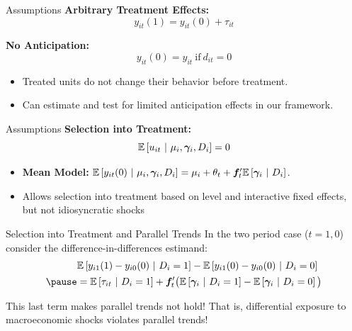 \documentclass[aspectratio=43,t]{beamer}
\begin{document}
\begin{frame}{Assumptions}
    \textbf{Arbitrary Treatment Effects:}
    \begin{equation}
        y_{it}(1) = y_{it}(0) + \tau_{it}
    \end{equation}


    \bigskip\pause
    \textbf{No Anticipation:}
    $$
      y_{it}(0) = y_{it} \ \text{if}\  d_{it} = 0
    $$

    \begin{itemize}
        \item Treated units do not change their behavior before treatment.
        \item Can estimate and test for limited anticipation effects in our framework. 
    \end{itemize}
\end{frame}

\begin{frame}{Assumptions}
    \textbf{Selection into Treatment:}
    \begin{equation*}
        \mathbb{E}\left[u_{it} \ \vert \ \mu_i, \bm \gamma_i, D_i\right] = 0
    \end{equation*}
    
    \begin{itemize}
        \item \textbf{Mean Model:} $\mathbb{E}\left[y_{it}(0) \ \vert \ \mu_i, \bm \gamma_i, D_i\right] = \mu_i + \theta_t + \bm f_t' \mathbb{E}\left[\bm \gamma_i \ \vert \ D_i\right]$.

        \item Allows selection into treatment based on level and interactive fixed effects, but not idiosyncratic shocks
    \end{itemize}
\end{frame}

\begin{frame}{Selection into Treatment and Parallel Trends}
    In the two period case ($t = 1, 0$) consider the difference-in-differences estimand:
    \begin{align*}
        &\condexpec{y_{i1}(1) - y_{i0}(0)}{D_i = 1} - \condexpec{y_{i1}(0) - y_{i0}(0)}{D_i = 0} \\ \pause
        &= \condexpec{\tau_{it}}{D_i = 1} + \bm f_t' \big( \condexpec{\bm \gamma_i}{D_i = 1} - \condexpec{\bm \gamma_i}{D_i = 0} \big) 
    \end{align*}
    
    \bigskip \pause
    This last term makes parallel trends not hold! That is, differential exposure to macroeconomic shocks violates parallel trends!
\end{frame}
\end{document}
